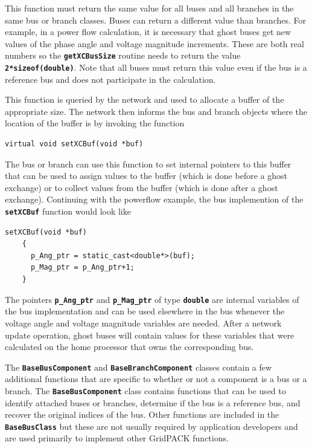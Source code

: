 This function must return the same value for all buses and all branches in the same bus or branch classes. Buses can return a different value than branches. For example, in a power flow calculation, it is necessary that ghost buses get new values of the phase angle and voltage magnitude increments. These are both real numbers so the \texttt{\textbf{getXCBusSize}} routine needs to return the value \texttt{\textbf{2*sizeof(double)}}. Note that all buses must return this value even if the bus is a reference bus and does not participate in the calculation.

This function is queried by the network and used to allocate a buffer of the appropriate size. The network then informs the bus and branch objects where the location of the buffer is by invoking the function

{
\color{red}
\begin{Verbatim}[fontseries=b]
virtual void setXCBuf(void *buf)
\end{Verbatim}
}

The bus or branch can use this function to set internal pointers to this buffer that can be used to assign values to the buffer (which is done before a ghost exchange) or to collect values from the buffer (which is done after a ghost exchange). Continuing with the powerflow example, the bus implemention of the \texttt{\textbf{setXCBuf}} function would look like

{
\color{red}
\begin{Verbatim}[fontseries=b]
    setXCBuf(void *buf)
    {
      p_Ang_ptr = static_cast<double*>(buf);
      p_Mag_ptr = p_Ang_ptr+1;
    }
\end{Verbatim}
}

The pointers \texttt{\textbf{p\_Ang\_ptr}} and \texttt{\textbf{p\_Mag\_ptr}} of type \texttt{\textbf{double}} are internal variables of the bus implementation and can be used elsewhere in the bus whenever the voltage angle and voltage magnitude variables are needed. After a network update operation, ghost buses will contain values for these variables that were calculated on the home processor that owns the corresponding bus.

The \texttt{\textbf{BaseBusComponent}} and \texttt{\textbf{BaseBranchComponent}} classes contain a few additional functions that are specific to whether or not a component is a bus or a branch. The \texttt{\textbf{BaseBusComponent}} class contains functions that can be used to identify attached buses or branches, determine if the bus is a reference bus, and recover the original indices of the bus. Other functions are included in the \texttt{\textbf{BaseBusClass}} but these are not usually required by application developers and are used primarily to implement other GridPACK functions.

